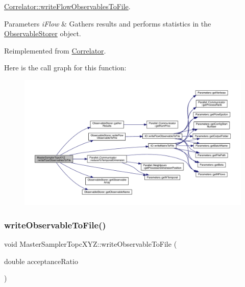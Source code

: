 \mbox{\hyperlink{class_correlator_a168512b2ce182d9478db47f100125fa6}{Correlator\+::write\+Flow\+Observables\+To\+File}}. 


\begin{DoxyParams}{Parameters}
{\em i\+Flow} & Gathers results and performs statistics in the \mbox{\hyperlink{class_observable_storer}{Observable\+Storer}} object. \\
\hline
\end{DoxyParams}


Reimplemented from \mbox{\hyperlink{class_correlator_a168512b2ce182d9478db47f100125fa6}{Correlator}}.

Here is the call graph for this function\+:\nopagebreak
\begin{figure}[H]
\begin{center}
\leavevmode
\includegraphics[width=350pt]{class_master_sampler_topc_x_y_z_a4fba4290e4406e18ef3f2904c6ae364f_cgraph}
\end{center}
\end{figure}
\mbox{\label{class_master_sampler_topc_x_y_z_a930f13a2a13f4b3820f40c8b52110cf2}} 
\subsubsection{\texorpdfstring{writeObservableToFile()}{writeObservableToFile()}}
{\footnotesize\ttfamily void Master\+Sampler\+Topc\+X\+Y\+Z\+::write\+Observable\+To\+File (\begin{DoxyParamCaption}\item[{double}]{acceptance\+Ratio }\end{DoxyParamCaption})\hspace{0.3cm}{\ttfamily [virtual]}}



